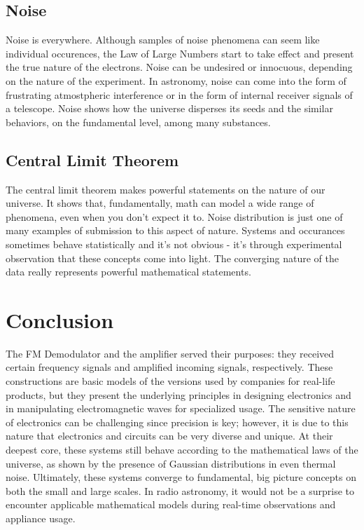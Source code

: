 \documentclass[12pt]{article}
\begin{document}
\subsection{Noise}
Noise is everywhere. Although samples of noise phenomena can seem like
individual occurences, the Law of Large Numbers start to take effect and
present the true nature of the electrons. Noise can be undesired or
innocuous, depending on the nature of the experiment. In astronomy,
noise can come into the form of frustrating atmostpheric interference or in the form
of internal receiver signals of a telescope. Noise shows how the
universe disperses its seeds and the similar behaviors, on the fundamental
level, among many substances.
\subsection{Central Limit Theorem}
The central limit theorem makes powerful statements on the nature of our
universe. It shows that, fundamentally, math can model a wide range of
phenomena, even when you don't expect it to. Noise distribution is just
one of many examples of submission to this aspect of nature. Systems and occurances
sometimes behave statistically and it's not obvious - it's through
experimental observation that these concepts come into light. The
converging nature of the data really represents powerful mathematical statements.

\section{Conclusion}
The FM Demodulator and the amplifier served their purposes: they
received certain frequency signals and amplified incoming signals,
respectively. These constructions are basic models of the versions used
by companies for real-life products, but they present the underlying
principles in designing electronics and in manipulating electromagnetic
waves for specialized usage. The sensitive nature of electronics can be
challenging since precision is key; however, it is due to this nature
that electronics and circuits can be very diverse and unique. At their
deepest core, these systems still behave according to the mathematical
laws of the universe, as shown by the presence of Gaussian distributions
in even thermal noise. Ultimately, these systems converge to
fundamental, big picture concepts on both the small and large scales. In
radio astronomy, it would not be a surprise to encounter applicable
mathematical models during  real-time observations and appliance usage.
\end{document}
